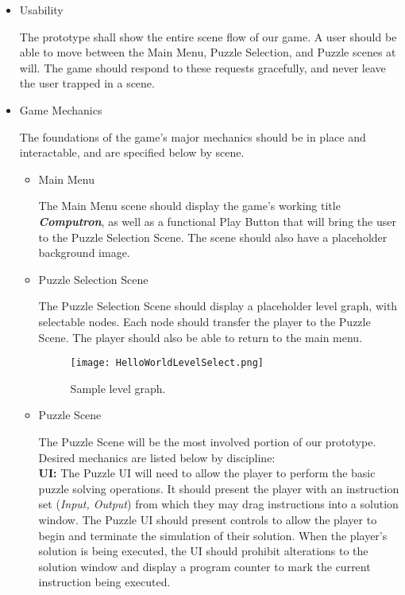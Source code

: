 \begin{itemize}
  \item Usability
  
  The prototype shall show the entire scene flow of our game. A user should be able to move between the Main Menu, Puzzle Selection, and Puzzle scenes at will. The game should respond to these requests gracefully, and never leave the user trapped in a scene. 

  \item Game Mechanics

  The foundations of the game's major mechanics should be in place and interactable, and are specified below by scene.
  \begin{itemize}
    \item Main Menu
    
    The Main Menu scene should display the game's working title \textbf{\textit{Computron}}, as well as a functional Play Button that will bring the user to the Puzzle Selection Scene. The scene should also have a placeholder background image.

    \item Puzzle Selection Scene
    
    The Puzzle Selection Scene should display a placeholder level graph, with selectable nodes. Each node should transfer the player to the Puzzle Scene. The player should also be able to return to the main menu.

    \begin{figure}[!hb]
      \begin{center}
        \texttt{[image: HelloWorldLevelSelect.png]}
        \caption{Sample level graph.}
        \label{fig:boat1}
      \end{center}
    \end{figure}

    \item Puzzle Scene
    
    The Puzzle Scene will be the most involved portion of our prototype. Desired mechanics are listed below by discipline:\\

    \textbf{UI:} The Puzzle UI will need to allow the player to perform the basic puzzle solving operations. It should present the player with an instruction set (\textit{Input, Output}) from which they may drag instructions into a solution window. The Puzzle UI should present controls to allow the player to begin and terminate the simulation of their solution. When the player's solution is being executed, the UI should prohibit alterations to the solution window and display a program counter to mark the current instruction being executed.\\


\end{itemize}
\end{itemize}
